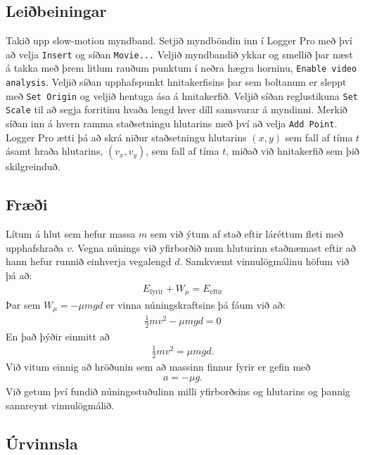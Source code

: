 \documentclass[oneside]{book}
\theoremstyle{definition}
\begin{document}
\subsection*{Leiðbeiningar}

Takið upp slow-motion myndband. Setjið myndböndin inn í Logger Pro með því að velja \verb|Insert| og síðan \verb|Movie...| 
Veljið myndbandið ykkar og smellið þar næst á takka með þrem litlum rauðum punktum í neðra hægra horninu, \verb|Enable video analysis|. Veljið síðan upphafspunkt hnitakerfisins þar sem boltanum er sleppt með \verb|Set Origin| og veljið hentuga ása á hnitakerfið. Veljið síðan reglustikuna \verb|Set Scale| til að segja forritinu hvaða lengd hver díll samsvarar á myndinni. Merkið síðan inn á hvern ramma staðsetningu hlutarins með því að velja \verb|Add Point|. Logger Pro ætti þá að skrá niður staðsetningu hlutarins $(x,y)$ sem fall af tíma $t$ ásamt hraða hlutarins, $(v_x, v_y)$, sem fall af tíma $t$,  miðað við hnitakerfið sem þið skilgreinduð.

\subsection*{Fræði}

Lítum á hlut sem hefur massa $m$ sem við ýtum af stað eftir láréttum fleti með upphafshraða $v$. Vegna núnings við yfirborðið mun hluturinn staðnæmast eftir að hann hefur runnið einhverja vegalengd $d$. Samkvæmt vinnulögmálinu höfum við þá að:
\begin{align*}
    E_{\text{fyrir}} + W_\mu = E_{\text{eftir}}
\end{align*}
Þar sem $W_\mu = -\mu mgd$ er vinna núningskraftsins þá fáum við að:
\begin{align*}
    \frac{1}{2}mv^2 - \mu mgd = 0
\end{align*}
En það þýðir einmitt að
\begin{align}
    \frac{1}{2}mv^2 = \mu mgd.
\end{align}
Við vitum einnig að hröðunin sem að massinn finnur fyrir er gefin með
\begin{align}
    a = -\mu g.
\end{align}
Við getum því fundið núningsstuðulinn milli yfirborðsins og hlutarins og þannig sannreynt vinnulögmálið.

\subsection*{Úrvinnsla}
\end{document}
